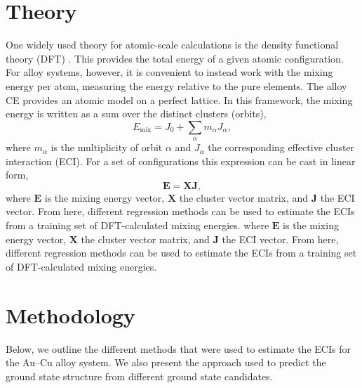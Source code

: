 \documentclass[a4paper, 12pt]{article}
\begin{document}
\section{Theory}
One widely used theory for atomic-scale calculations is the density functional theory (DFT) \cite{kohn1965self}. This provides the total energy of a given atomic configuration. For alloy systems, however, it is convenient to instead work with the mixing energy per atom, measuring the energy relative to the pure elements. %
The alloy CE provides an atomic model on a perfect lattice. In this framework, the mixing energy is written as a sum over the distinct clusters (orbits),
\begin{equation}
  E_{\text{mix}} = J_0 + \sum_{\alpha} m_{\alpha} J_{\alpha},
\end{equation}
where $m_{\alpha}$ is the multiplicity of orbit $\alpha$ and $J_{\alpha}$ the corresponding effective cluster interaction (ECI). For a set of configurations this expression can be cast in linear form,
\begin{equation}
  \bm{E} = \bm{X}\bm{J},
\end{equation}
where $\bm{E}$ is the mixing energy vector, $\bm{X}$ the cluster vector matrix, and $\bm{J}$ the ECI vector. From here, different regression methods can be used to estimate the ECIs from a training set of DFT-calculated mixing energies.
where $\bm{E}$ is the mixing energy vector, $\bm{X}$ the cluster vector matrix, and $\bm{J}$ the ECI vector. From here, different regression methods can be used to estimate the ECIs from a training set of DFT-calculated mixing energies.

\section{Methodology}
Below, we outline the different methods that were used to estimate the ECIs for the Au--Cu alloy system. We also present the approach used to predict the ground state structure from different ground state candidates.
\end{document}
